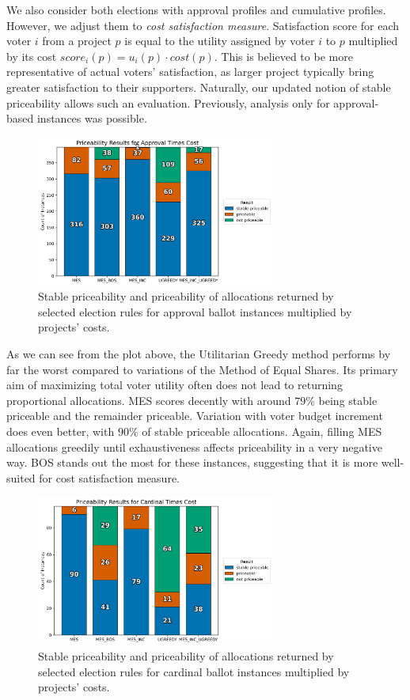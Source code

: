 We also consider both elections with approval profiles and cumulative profiles. However, we adjust them to \emph{cost satisfaction measure}. Satisfaction score for each voter $i$ from a project $p$ is equal to the utility assigned by voter $i$ to $p$ multiplied by its cost $score_i(p)=u_i(p)\cdot cost(p)$. This is believed to be more representative of actual voters' satisfaction, as larger project typically bring greater satisfaction to their supporters. Naturally, our updated notion of stable priceability allows such an evaluation. Previously, analysis only for approval-based instances was possible.
\begin{figure}[H]         
  \centering              
  \includegraphics[width=0.7\textwidth]{figures/plots/approval-times-cost/approval_times_cost_priceability.png}
  \caption{Stable priceability and priceability of allocations returned by selected election rules for approval ballot instances multiplied by projects' costs.}
  \label{fig:myplot}
\end{figure}
As we can see from the plot above, the Utilitarian Greedy method performs by far the worst compared to variations of the Method of Equal Shares. Its primary aim of maximizing total voter utility often does not lead to returning proportional allocations. MES scores decently with around $79\%$ being stable priceable and the remainder priceable. Variation with voter budget increment does even better, with $90\%$ of stable priceable allocations. Again, filling MES allocations greedily until exhaustiveness affects priceability in a very negative way. BOS stands out the most for these instances, suggesting that it is more well-suited for cost satisfaction measure.
\begin{figure}[H]         
  \centering              
  \includegraphics[width=0.7\textwidth]{figures/plots/cardinal-times-cost/cardinal_times_cost_priceability.png}
  \caption{Stable priceability and priceability of allocations returned by selected election rules for cardinal ballot instances multiplied by projects' costs.}
  \label{fig:myplot}
\end{figure}

